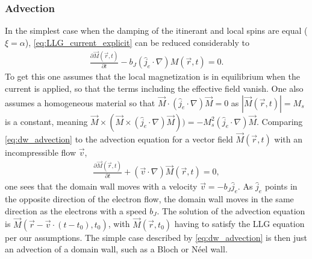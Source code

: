\documentclass[12pt, a4paper]{article}		%
\numberwithin{equation}{section}
\begin{document}
\subsubsection{Advection}
In the simplest case when the damping of the itinerant and local spins are equal ($\xi = \alpha$), \eqref{eq:LLG_current_explicit} can be reduced considerably to
\begin{align}
\label{eq:dw_advection}
\frac{\partial \vec{M}(\vec{r}, t)}{\partial t} - b_J(\hat{j}_e\cdot\nabla) M(\vec{r}, t) = 0.
\end{align}
To get this one assumes that the local magnetization is in equilibrium when the current is applied, so that the terms including the effective field vanish. One also assumes a homogeneous material so that $\vec{M}\cdot(\hat{j}_e\cdot\nabla)\vec{M} = 0$ as $|\vec{M}(\vec{r}, t)| = M_s$ is a constant, meaning $\vec{M}\times (\vec{M}\times(\hat{j}_e\cdot\nabla)\vec{M})) = -M_s^2(\hat{j}_e\cdot\nabla)\vec{M}$. Comparing \eqref{eq:dw_advection} to the advection equation for a vector field $\vec{M}(\vec{r}, t)$ with an incompressible flow $\vec{v}$,
\begin{align}
\label{eq:advection}
\frac{\partial \vec{M}(\vec{r}, t)}{\partial t} + (\vec{v}\cdot\nabla) \vec{M}(\vec{r}, t) = 0,
\end{align}
one sees that the domain wall moves with a velocity $\vec{v} = -b_J \hat{j}_e$. As $\hat{j}_e$ points in the opposite direction of the electron flow, the domain wall moves in the same direction as the electrons with a speed $b_J$. The solution of the advection equation is $\vec{M}(\vec{r} - \vec{v} \cdot (t - t_0), t_0)$, with $\vec{M}(\vec{r}, t_0)$ having to satisfy the LLG equation per our assumptions. The simple case described by \eqref{eq:dw_advection} is then just an advection of a domain wall, such as a Bloch or N\'{e}el wall.
\end{document}
